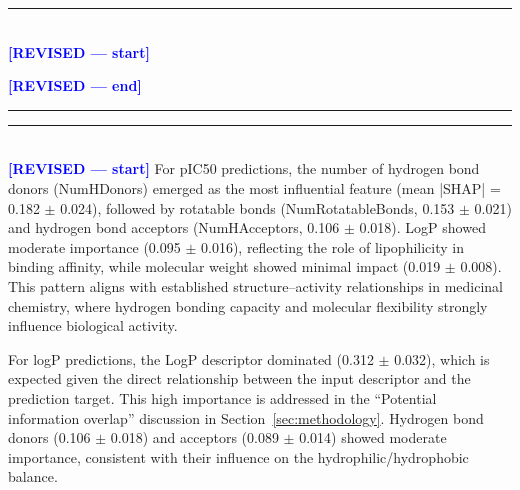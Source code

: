 \documentclass[preprint,12pt]{elsarticle}
\newcommand{\revisedstart}{\noindent\textcolor{blue}{\rule{\textwidth}{1pt}}\\\noindent\textcolor{blue}{\textbf{[REVISED --- start]}}\vspace{0.3em}}
\newcommand{\revisedend}{\vspace{0.3em}\noindent\textcolor{blue}{\textbf{[REVISED --- end]}}\\\noindent\textcolor{blue}{\rule{\textwidth}{1pt}}\vspace{0.5em}}
\renewcommand{\arraystretch}{1.1}
\begin{document}
\revisedstart
\begin{table}[H]
\centering
\caption{SHAP Feature Importance Analysis for Model Input Features}
\label{tab:shap_importance}

 \renewcommand{\arraystretch}{1.3}

\end{table}
\revisedend

\revisedstart
For pIC50 predictions, the number of hydrogen bond donors (NumHDonors) emerged as the most influential feature (mean |SHAP| = 0.182 $\pm$ 0.024), followed by rotatable bonds (NumRotatableBonds, 0.153 $\pm$ 0.021) and hydrogen bond acceptors (NumHAcceptors, 0.106 $\pm$ 0.018). LogP showed moderate importance (0.095 $\pm$ 0.016), reflecting the role of lipophilicity in binding affinity, while molecular weight showed minimal impact (0.019 $\pm$ 0.008). This pattern aligns with established structure--activity relationships in medicinal chemistry, where hydrogen bonding capacity and molecular flexibility strongly influence biological activity.

For logP predictions, the LogP descriptor dominated (0.312 $\pm$ 0.032), which is expected given the direct relationship between the input descriptor and the prediction target. This high importance is addressed in the ``Potential information overlap'' discussion in Section~\ref{sec:methodology}. Hydrogen bond donors (0.106 $\pm$ 0.018) and acceptors (0.089 $\pm$ 0.014) showed moderate importance, consistent with their influence on the hydrophilic/hydrophobic balance.
\end{document}
